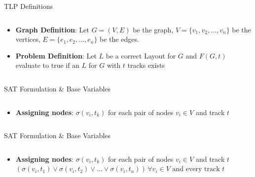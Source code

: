 \documentclass[hyperref={pdfpagelabels=false},aspectratio=169]{beamer}
\theoremstyle{definition}
\begin{document}
\begin{frame}{TLP Definitions}
    \begin{columns}
        \begin{column}{1\textwidth}
            \begin{itemize}
            \item \textbf{Graph Definition}: Let $G = (V,E)$ be the graph, $V =\{v_1,v_2,...,v_n\}$ be the vertices, $E = \{e_1,e_2,...,e_n\}$ be the edges.
            \item \textbf{Problem Definition}: Let $L$ be a correct Layout for $G$ and $F(G, t)$ evaluate to true if an $L$ for $G$ with $t$ tracks exists
            \end{itemize}
        \end{column}
    \end{columns}
\end{frame}

\begin{frame}{SAT Formulation \& Base Variables}
    \begin{columns}
        \begin{column}{1\textwidth}
            \begin{itemize}
            \item \textbf{Assigning nodes}: $\sigma(v_i,t_k)$ for each pair of nodes $v_i \in V$ and track $t$
            \end{itemize}
        \end{column}
    \end{columns}
\end{frame}

\begin{frame}{SAT Formulation \& Base Variables}
    \begin{columns}
        \begin{column}{1\textwidth}
            \begin{itemize}
            \item \textbf{Assigning nodes}: $\sigma(v_i,t_k)$ for each pair of nodes $v_i \in V$ and track $t$
            \newline
            \newline
            \cdot  \,  $(\sigma(v_i,t_1) \lor \sigma(v_i,t_2) \lor \dots \lor \sigma(v_i,t_n)) \, \forall v_i \in V \text{ and every track }t $ 
            \end{itemize}
        \end{column}
    \end{columns}
\end{frame}
\end{document}
